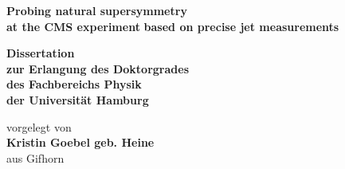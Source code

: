 \documentclass[
twoside=true,
BCOR10mm,
headsepline,     %
headings=normal,
open=right,
numbers=noenddot, %
a4paper
]{scrreprt} %
\author{Kristin Goebel}
\begin{document}
\begin{titlepage}
  \begin{center}
    \thispagestyle{empty}
    \vspace*{1cm}
    \begin{doublespace} 
       \textbf{\LARGE Probing natural supersymmetry} \\
       \vskip0.4cm
       \textbf{\LARGE at the CMS experiment}
       \vskip0.4cm
       \textbf{\LARGE based on precise jet measurements}
      \vskip2.5cm
      \begin{Large} 
        \textbf{Dissertation\\
          zur Erlangung des Doktorgrades\\
          des Fachbereichs Physik\\
          der Universit\"{a}t Hamburg\\}
      \end{Large}
      \vskip2cm
      \begin{large}
        vorgelegt von\\
        {\bf Kristin Goebel geb. Heine}\\
        aus Gifhorn
        \vfill
      \end{large}
    \end{doublespace} 
  \end{center}
\end{titlepage}


\newpage 
\thispagestyle{empty}
\quad 
\newpage
\thispagestyle{empty}
\end{document}
